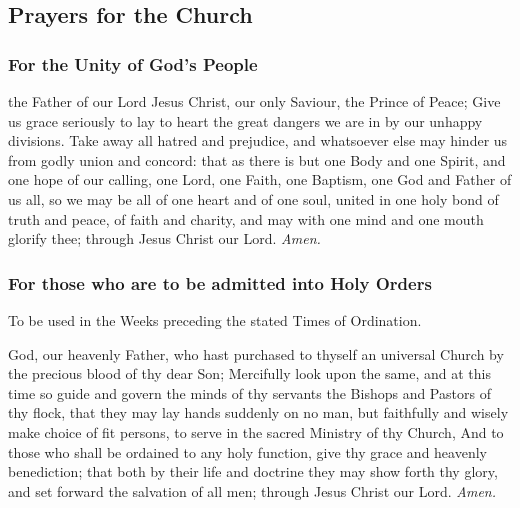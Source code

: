 \subsection{Prayers for the Church}
\subsubsection{For the Unity of God's People}
 the Father of our Lord Jesus Christ, our only Saviour, the Prince of Peace; Give us grace seriously to lay to heart the great dangers we are in by our unhappy divisions. Take away all hatred and prejudice, and whatsoever else may hinder us from godly union and concord: that as there is but one Body and one Spirit, and one hope of our calling, one Lord, one Faith, one Baptism, one God and Father of us all, so we may be all of one heart and of one soul, united in one holy bond of truth and peace, of faith and charity, and may with one mind and one mouth glorify thee; through Jesus Christ our Lord. \textit{Amen.}

\subsubsection{For those who are to be admitted into Holy Orders}
\begin{rubric}
To be used in the Weeks preceding the stated Times of Ordination.
\end{rubric}
 God, our heavenly Father, who hast purchased to thyself an universal Church by the precious blood of thy dear Son; Mercifully look upon the same, and at this time so guide and govern the minds of thy servants the Bishops and Pastors of thy flock, that they may lay hands suddenly on no man, but faithfully and wisely make choice of fit persons, to serve in the sacred Ministry of thy Church, And to those who shall be ordained to any holy function, give thy grace and heavenly benediction; that both by their life and doctrine they may show forth thy glory, and set forward the salvation of all men; through Jesus Christ our Lord. \textit{Amen.}
